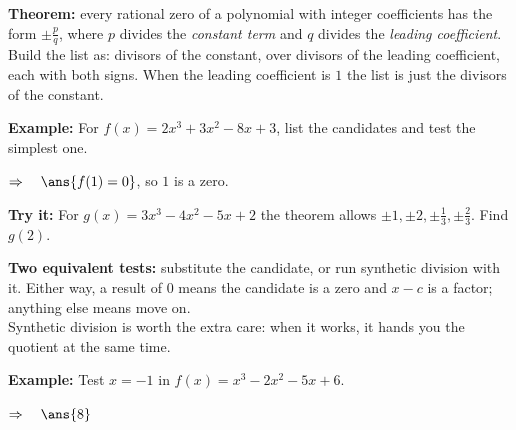 \documentclass[12pt]{article}
\begin{document}


\begin{formulabox}
\textbf{Theorem:} every rational zero of a polynomial with integer coefficients
has the form $\pm \frac{p}{q}$, where $p$ divides the \textit{constant term} and
$q$ divides the \textit{leading coefficient}.\\[3pt]
Build the list as: divisors of the constant, over divisors of the leading
coefficient, each with both signs. When the leading coefficient is $1$ the list
is just the divisors of the constant.
\end{formulabox}

\begin{examplebox}
\textbf{Example:} \quad For $f(x) = 2x^{3} + 3x^{2} - 8x + 3$, list the
candidates and test the simplest one.

$\Rightarrow\quad \ans{f(1) = 0}$, so $1$ is a zero.
\end{examplebox}

\begin{tryitbox}
\textbf{Try it:} \quad For $g(x) = 3x^{3} - 4x^{2} - 5x + 2$ the theorem allows
$\pm 1, \pm 2, \pm \frac{1}{3}, \pm \frac{2}{3}$. Find $g(2)$.\\[2pt]
\end{tryitbox}


\begin{formulabox}
\textbf{Two equivalent tests:} substitute the candidate, or run synthetic
division with it. Either way, a result of $0$ means the candidate is a zero and
$x - c$ is a factor; anything else means move on.\\[3pt]
Synthetic division is worth the extra care: when it works, it hands you the
quotient at the same time.
\end{formulabox}

\begin{examplebox}
\textbf{Example:} \quad Test $x = -1$ in $f(x) = x^{3} - 2x^{2} - 5x + 6$.

$\Rightarrow\quad \ans{8}$
\end{examplebox}
\end{document}
